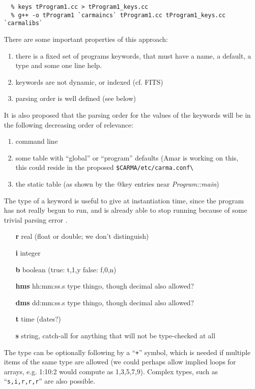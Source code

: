 \documentclass[preprint]{aastex} %
\begin{document}
\begin{verbatim}
  % keys tProgram1.cc > tProgram1_keys.cc
  % g++ -o tProgram1 `carmaincs` tProgram1.cc tProgram1_keys.cc `carmalibs`
\end{verbatim}

There are some important properties of this approach:
\begin{enumerate}
\item there is a fixed set of programs keywords, 
that must have a name, a default, a type and some one line help. 
\item keywords are not dynamic, or indexed (cf. FITS)
\item parsing order is well defined (see below)
\end{enumerate}

It is also proposed that the parsing order for the values of the keywords
will be in the following decreasing order of relevance:
\begin{enumerate}
\item command line
\item some table with ``global'' or ``program'' defaults (Amar is working on this,
  this could reside in the proposed \verb+$CARMA/etc/carma.conf\+
\item the static table (as shown by the @key entries near {\it Program::main})
\end{enumerate}

The type of a keyword is useful to give at instantiation time, since the program has
not really begun to run, 
and is already able to stop running because of some trivial parsing error .
\begin{itemize}
\item[{\bf r}] real (float or double; we don't distinguish)
\item[{\bf i}] integer
\item[{\bf b}] boolean (true: t,1,y   false: f,0,n)
\item[{\bf hms}] hh:mm:ss.s type thingo, though decimal also allowed?
\item[{\bf dms}] dd:mm:ss.s type thingo, though decimal also allowed?
\item[{\bf t}] time (dates?) 
\item[{\bf s}] string, catch-all for anything that will not be type-checked at all
\end{itemize}

The type can be optionally following by a ``{\tt +}'' symbol, which is needed if multiple items
of the same type are allowed (we could perhaps allow implied loops
for arrays, e.g. 1:10:2  would compute as 1,3,5,7,9). Complex types, such as 
``{\tt s,i,r,r,r}'' are also possible.
\end{document}
